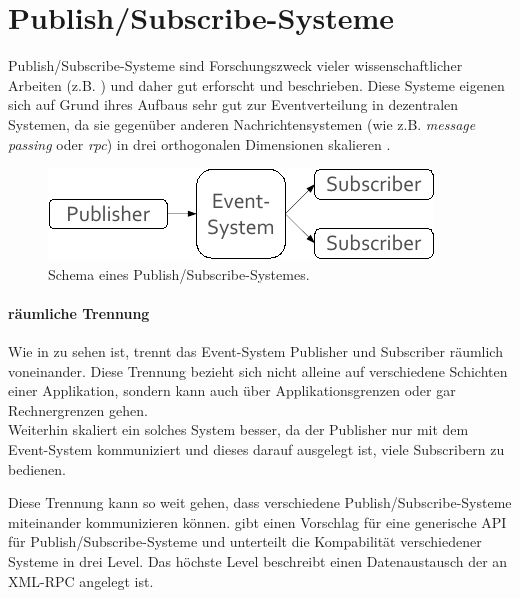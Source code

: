 \section{Publish/Subscribe-Systeme}
\label{chap:grundlagen:pubsub}

Publish/Subscribe-Systeme sind Forschungszweck vieler wissenschaftlicher Arbeiten (z.B. \cite{Banerjee2001Comparative, Liu2003Survey, Muhl2002LargeScale, FiegeSecurity, Castro2002Scribe}) und daher gut erforscht und beschrieben. Diese Systeme eigenen sich auf Grund ihres Aufbaus sehr gut zur Eventverteilung in dezentralen Systemen, da sie gegenüber anderen Nachrichtensystemen (wie z.B. \emph{message passing} oder \emph{rpc}) in drei orthogonalen Dimensionen skalieren \cite{PatrickTh2003Many}.

\begin{figure}[htbp]
\centering
\includegraphics{grafics/pubsub_black_box.pdf}
\caption{Schema eines Publish/Subscribe-Systemes.}
\label{fig:pubsub_black_box}
\end{figure}

\paragraph{räumliche Trennung}
Wie in  zu sehen ist, trennt das Event-System Publisher und Subscriber räumlich voneinander. Diese Trennung bezieht sich nicht alleine auf verschiedene Schichten einer Applikation, sondern kann auch über Applikationsgrenzen oder gar Rechnergrenzen gehen. \\
Weiterhin skaliert ein solches System besser, da der Publisher nur mit dem Event-System kommuniziert und dieses darauf ausgelegt ist, viele Subscribern zu bedienen.



Diese Trennung kann so weit gehen, dass verschiedene Publish/Subscribe-Systeme miteinander kommunizieren können. \cite{PiEyKoSh2007-PubSubAPI} gibt einen Vorschlag für eine generische API für Publish/Subscribe-Systeme und unterteilt die Kompabilität verschiedener Systeme in drei Level. Das höchste Level beschreibt einen Datenaustausch der an XML-RPC angelegt ist.

